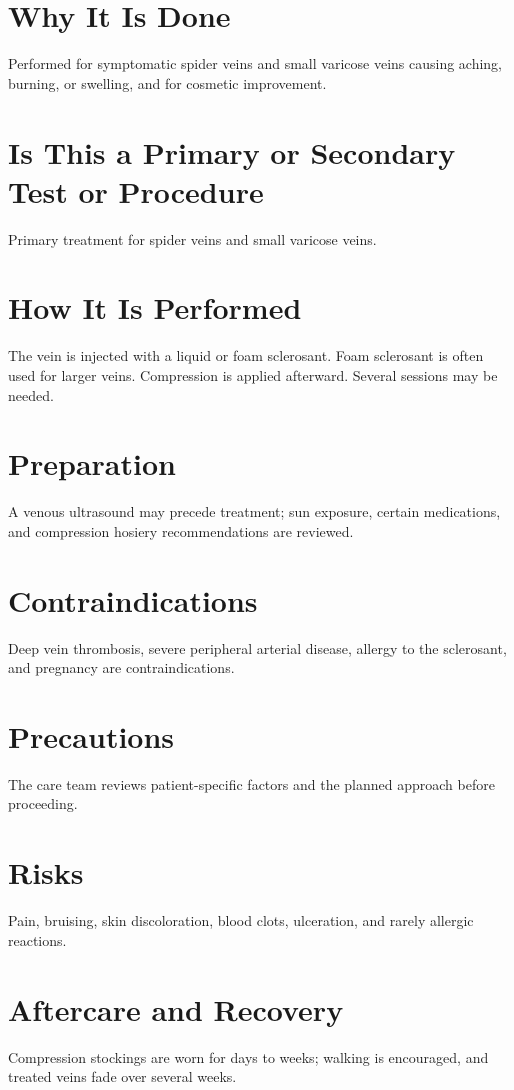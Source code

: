 \section*{Why It Is Done}
Performed for symptomatic spider veins and small varicose veins causing aching, burning, or swelling, and for cosmetic improvement.

\section*{Is This a Primary or Secondary Test or Procedure}
Primary treatment for spider veins and small varicose veins.

\section*{How It Is Performed}
The vein is injected with a liquid or foam sclerosant. Foam sclerosant is often used for larger veins. Compression is applied afterward. Several sessions may be needed.

\section*{Preparation}
A venous ultrasound may precede treatment; sun exposure, certain medications, and compression hosiery recommendations are reviewed.

\section*{Contraindications}
Deep vein thrombosis, severe peripheral arterial disease, allergy to the sclerosant, and pregnancy are contraindications.

\section*{Precautions}
The care team reviews patient-specific factors and the planned approach before proceeding.

\section*{Risks}
Pain, bruising, skin discoloration, blood clots, ulceration, and rarely allergic reactions.

\section*{Aftercare and Recovery}
Compression stockings are worn for days to weeks; walking is encouraged, and treated veins fade over several weeks.


